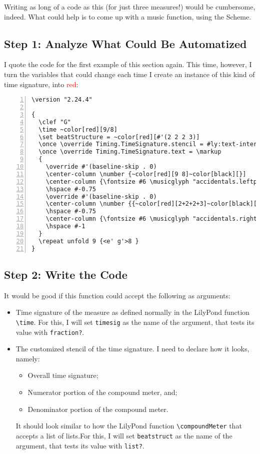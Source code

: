 Writing as long of a code as this (for just three measures!) would be cumbersome, indeed. What could help is to come up with a music function, using the Scheme. 

\subsection{Step 1: Analyze What Could Be Automatized}

I quote the code for the first example of this section again. This time, however, I turn the variables that could change each time I create an instance of this kind of time signature, into \textcolor{red}{red}:

\begin{Verbatim}[numbers=left,xleftmargin=5mm,commandchars={~[]}]
\version "2.24.4"

{
  \clef "G"
  \time ~color[red][9/8]
  \set beatStructure = ~color[red][#'(2 2 2 3)]
  \once \override Timing.TimeSignature.stencil = #ly:text-interface::print
  \once \override Timing.TimeSignature.text = \markup
  {
    \override #'(baseline-skip . 0)
    \center-column \number {~color[red][9 8]~color[black][}]
    \center-column {\fontsize #6 \musicglyph "accidentals.leftparen"}
    \hspace #-0.75
    \override #'(baseline-skip . 0)
    \center-column \number {{~color[red][2+2+2+3]~color[black][}{]~color[red][8]~color[black][}}]
    \hspace #-0.75
    \center-column {\fontsize #6 \musicglyph "accidentals.rightparen"}
    \hspace #-1
  }
  \repeat unfold 9 {<e' g'>8 }
}
\end{Verbatim}



\subsection{Step 2: Write the Code}

It would be good if this function could accept the following as arguments:

\begin{itemize}
\item Time signature of the measure as defined normally in the LilyPond function \verb|\time|. For this, I will set \verb|timesig| as the name of the argument, that tests its value with \verb|fraction?|.
\item The customized stencil of the time signature. I need to declare how it looks, namely:
\begin{itemize}
\item Overall time signature;
\item Numerator portion of the compound meter, and;
\item Denominator portion of the compound meter.
\end{itemize} 
It should look similar to how the LilyPond function \verb|\compoundMeter| that accepts a list of lists.For this, I will set \verb|beatstruct| as the name of the argument, that tests its value with \verb|list?|.
\end{itemize}

